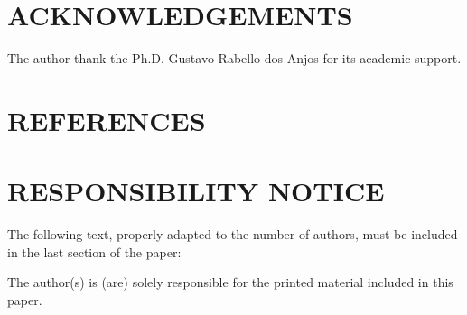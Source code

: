 \documentclass[10pt,fleqn,a4paper,twoside]{article}
\begin{document}
\section{ACKNOWLEDGEMENTS}
The author thank the Ph.D. Gustavo Rabello dos Anjos 
for its academic support.

\section{REFERENCES} 
\label{Sec:references}


\renewcommand{\refname}{}




\section{RESPONSIBILITY NOTICE}
The following text, properly adapted to the number of authors, must be included in the last section of the paper:

The author(s) is (are) solely responsible for the printed material included in this paper.
\end{document}
